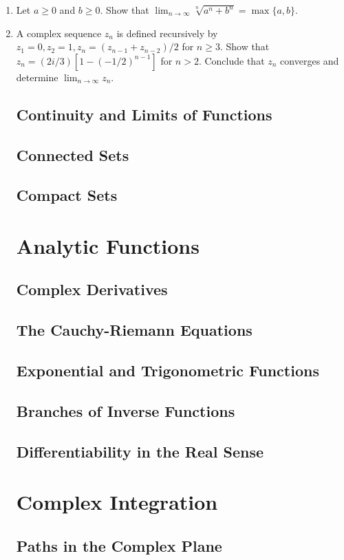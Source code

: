 \documentclass[11pt, a4paper, latinreim, shortsets]{notes}
\begin{document}
\begin{enumerate}[label={\bfseries II.5.\arabic*}]
\item Let $a \geq 0$ and $b \geq 0$. Show that $\lim_{n\to\infty} \sqrt[n]{a^n + b^n} = \max\{a,b\}$.

\item A complex sequence $z_n$ is defined recursively by $z_1 = 0, z_2 = 1, z_n = (z_{n-1}+z_{n-2})/2$
for $n \geq 3$. Show that $z_n = (2i/3)[1-(-1/2)^{n-1}]$ for $n > 2$. Conclude that $z_n$ converges and
determine $\lim_{n\to\infty} z_n$.

\section{Continuity and Limits of Functions}
\section{Connected Sets}
\section{Compact Sets}

\chapter{Analytic Functions}
\section{Complex Derivatives}
\section{The Cauchy-Riemann Equations}
\section{Exponential and Trigonometric Functions}
\section{Branches of Inverse Functions}
\section{Differentiability in the Real Sense}

\chapter{Complex Integration}
\section{Paths in the Complex Plane}

\end{enumerate}
\end{document}
